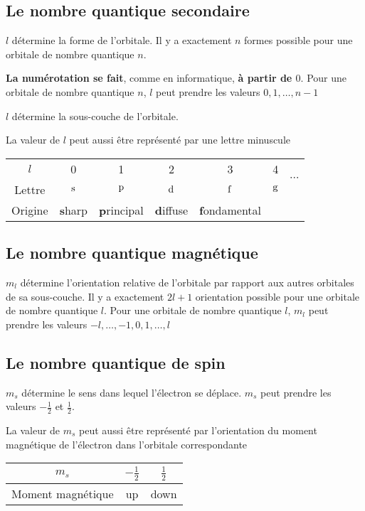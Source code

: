 \subsection{Le nombre quantique secondaire}
$l$ détermine la forme de l'orbitale.
Il y a exactement $n$ formes possible pour une orbitale de nombre quantique $n$.

{\bf La numérotation se fait}, comme en informatique, {\bf à partir de $0$}.
Pour une orbitale de nombre quantique $n$, $l$ peut prendre les valeurs $0, 1, \ldots, n-1$

$l$ détermine la sous-couche de l'orbitale.

La valeur de $l$ peut aussi être représenté par une lettre minuscule

\begin{center}
	\begin{tabular}{c|cccccc}
		$l$ & 0 & 1 & 2 & 3 & 4 & \multirow{2}{*}{$\cdots$}\\
		\cline{1-6}
		Lettre & $\mathrm{s}$ & $\mathrm{p}$ & $\mathrm{d}$ & $\mathrm{f}$ & $\mathrm{g}$\\
		Origine & {\bf s}harp & {\bf p}rincipal & {\bf d}iffuse & {\bf f}ondamental
	\end{tabular}
\end{center}

\subsection{Le nombre quantique magnétique}
$m_l$ détermine l'orientation relative de l'orbitale par rapport aux autres orbitales de sa sous-couche.
Il y a exactement $2l + 1$ orientation possible pour une orbitale de nombre quantique $l$.
Pour une orbitale de nombre quantique $l$, $m_l$ peut prendre les valeurs $-l, \ldots, -1,  0, 1, \ldots, l$

\subsection{Le nombre quantique de spin}
$m_s$ détermine le sens dans lequel l'électron se déplace.
$m_s$ peut prendre les valeurs $-\frac{1}{2}$ et $\frac{1}{2}$.

La valeur de $m_s$ peut aussi être représenté par l'orientation du moment magnétique de l'électron dans l'orbitale correspondante
\begin{center}
	\begin{tabular}{c|cc}
		$m_s$ & $-\frac{1}{2}$ & $\frac{1}{2}$\\
		\hline
		Moment magnétique & up & down
	\end{tabular}
\end{center}

